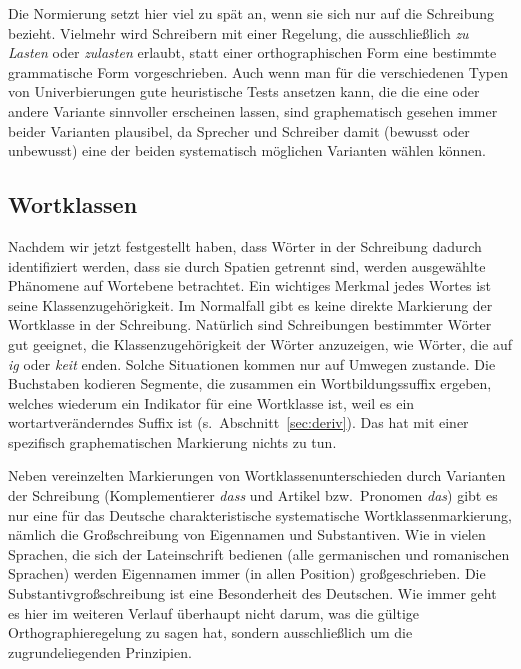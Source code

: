 Die Normierung setzt hier viel zu spät an, wenn sie sich nur auf die Schreibung bezieht.
Vielmehr wird Schreibern mit einer Regelung, die \zB ausschließlich \textit{zu Lasten} oder \textit{zulasten} erlaubt, statt einer orthographischen Form eine bestimmte grammatische Form vorgeschrieben.
Auch wenn man für die verschiedenen Typen von Univerbierungen gute heuristische Tests ansetzen kann, die die eine oder andere Variante sinnvoller erscheinen lassen, sind graphematisch gesehen immer beider Varianten plausibel, da Sprecher und Schreiber damit (bewusst oder unbewusst) eine der beiden systematisch möglichen Varianten wählen können.

\subsection{Wortklassen}

\label{sec:wortklassschreib}

Nachdem wir jetzt festgestellt haben, dass Wörter in der Schreibung dadurch identifiziert werden, dass sie durch Spatien getrennt sind, werden ausgewählte Phänomene auf Wortebene betrachtet.
Ein wichtiges Merkmal jedes Wortes ist seine Klassenzugehörigkeit.
Im Normalfall gibt es keine direkte Markierung der Wortklasse in der Schreibung.
Natürlich sind Schreibungen bestimmter Wörter gut geeignet, die Klassenzugehörigkeit der Wörter anzuzeigen, wie \zB Wörter, die auf \textit{ig} oder \textit{keit} enden.
Solche Situationen kommen nur auf Umwegen zustande.
Die Buchstaben kodieren Segmente, die zusammen ein Wortbildungssuffix ergeben, welches wiederum ein Indikator für eine Wortklasse ist, weil es ein wortartveränderndes Suffix ist (s.\ Abschnitt~\ref{sec:deriv}).
Das hat mit einer spezifisch graphematischen Markierung nichts zu tun.

Neben vereinzelten Markierungen von Wortklassenunterschieden durch Varianten der Schreibung (Komplementierer \textit{dass} und Artikel bzw.\ Pronomen \textit{das}) gibt es nur eine für das Deutsche charakteristische systematische Wortklassenmarkierung, nämlich die Großschreibung von Eigennamen und Substantiven.
Wie in vielen Sprachen, die sich der Lateinschrift bedienen (\zB alle germanischen und romanischen Sprachen) werden Eigennamen immer (in allen Position) großgeschrieben.
Die Substantivgroßschreibung ist eine Besonderheit des Deutschen.
Wie immer geht es hier im weiteren Verlauf überhaupt nicht darum, was die gültige Orthographieregelung zu sagen hat, sondern ausschließlich um die zugrundeliegenden Prinzipien.

